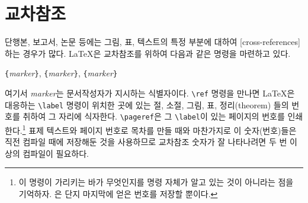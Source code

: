 \section{교차참조}

단행본, 보고서, 논문 등에는 그림, 표, 텍스트의 특정 부분에 대하여 [cross-references]하는 경우가 많다.
\LaTeX 은 교차참조를 위하여 다음과 같은 명령을 마련하고 있다.
\begin{lscommand}
\verb|{|\emph{marker}\verb|}|, \verb|{|\emph{marker}\verb|}|, \verb|{|\emph{marker}\verb|}|
\end{lscommand}
\noindent 여기서 \emph{marker}는 문서작성자가 지시하는 식별자이다. \verb|\ref| 명령을 만나면 \LaTeX 은 
대응하는 \verb|\label| 명령이 위치한 곳에 있는 절, 소절, 그림, 표, 정리(theorem) 들의 번호를 취하여 그 자리에 식자한다.
\verb|\pageref|은 그 \verb|\label|이 있는 페이지의 번호를 인쇄한다.\footnote{%
  이 명령이 가리키는 바가 무엇인지를 명령 자체가 알고 있는 것이 아니라는 점을 기억하자. 
  은 단지 마지막에 얻은 번호를 저장할 뿐이다.
}
표제 텍스트와 페이지 번호로 목차를 만들 때와 마찬가지로 이 숫자(번호)들은 직전 컴파일 때에 저장해둔 것을 사용하므로 
교차참조 숫자가 잘 나타나려면 두 번 이상의 컴파일이 필요하다.

